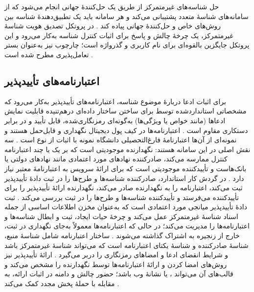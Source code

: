 \documentclass[12pt,a4paper]{article}
\begin{document}
حل شناسه‌های غیرمتمرکز از طریق یک حل‌کنندهٔ جهانی انجام می‌شود که از سامانه‌های شناسهٔ متعدد پشتیبانی می‌کند و هر سامانه باید یک تطبیق‌دهندهٔ شناسه بین روش‌های خاص و حل‌کنندهٔ جهانی پیاده کند \cite{mazzocca2025survey}. در پروتکل تصدیق هویت شناسهٔ غیرمتمرکز، یک چرخهٔ چالش و پاسخ برای اثبات کنترل شناسه به‌کار می‌رود و این پروتکل جایگزین بالقوه‌ای برای نام کاربری و گذرواژه است؛ چارچوب  نیز به‌عنوان بستر تعامل‌پذیری مطرح شده است \cite{mazzocca2025survey}.

\subsection{اعتبارنامه‌های تأییدپذیر }

برای اثبات ادعا دربارهٔ موضوع شناسه، اعتبارنامه‌های تأییدپذیر  به‌کار می‌رود که مشخصاتی استانداردشده توسط  برای ساختن ساختار داده‌ای درهم‌تنیده قابلیت نمایش ادعا‌ها (مانند خواص یا ویژگی‌ها) به‌گونه‌ای رمزنگاری‌شده، قابل تأیید و در برابر دستکاری مقاوم است \cite{mazzocca2025survey}. اعتبارنامه‌ها در کیف پول دیجیتال نگهداری و قابل‌حمل هستند و نمونه‌ای از آن‌ها اعتبارنامهٔ فارغ‌التحصیلی دانشگاه نمونه با اثبات از نوع  است \cite{mazzocca2025survey}. سه نقش اصلی در این سامانه هستند: نگهدارنده  موجودیتی است که بر یک یا چند اعتبارنامه کنترل ممارسه می‌کند، صادرکننده  نهاد‌های مورد اعتمادی مانند نهاد‌های دولتی یا بانک‌هاست و تأییدکننده  موجودیتی است که برای ارائهٔ سرویس به اعتبارنامهٔ معتبر نیاز دارد \cite{mazzocca2025survey}. در گردش کار استاندارد، صادرکننده شناسه‌ها و طرح‌ها را در ثبت دادهٔ تأییدپذیر ثبت می‌کند، اعتبارنامه را به نگهدارنده صادر می‌کند، نگهدارنده ارائهٔ تأییدپذیر را برای تأییدکننده می‌فرستد و تأییدکننده شناسه‌ها و طرح‌ها را در ثبت بررسی می‌کند \cite{mazzocca2025survey}. ثبت دادهٔ تأییدپذیر  میانجی مورد اعتمادی است که به‌عنوان مخزن اطلاعات اساسی از جمله اسناد شناسهٔ غیرمتمرکز عمل می‌کند و چرخهٔ حیات ایجاد، ثبت و ابطال شناسه‌ها و اعتبارنامه‌ها را مدیریت می‌کند؛ در حالی که اعتبارنامه‌ها معمولاً به‌جای نگهداری در ثبت، خارج از زنجیره به اشتراک گذاشته می‌شوند \cite{mazzocca2025survey}. ساختار اعتبارنامه شامل شناسهٔ منبع، شناسهٔ صادرکننده و شناسهٔ یکتای اعتبارنامه است که می‌تواند شناسهٔ غیرمتمرکز باشد و شرایط انقضای ادعا و امضا‌های رمزنگاری را دربر می‌گیرد \cite{mazzocca2025survey}. ارائهٔ تأییدپذیر  نیز روش‌های امضا کردن و ارائهٔ اعتبارنامه‌ها توسط نگهدارنده را مشخص می‌کند و قالب‌های آن می‌تواند ،  یا نشانهٔ وب  باشد؛ حضور چالش و دامنه در اثبات ارائه، به مقابله با حملهٔ پخش مجدد کمک می‌کند \cite{mazzocca2025survey}.
\end{document}
